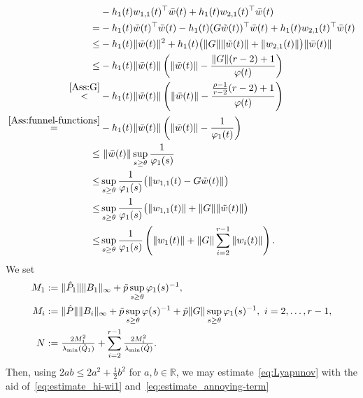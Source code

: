 \documentclass[ envcountsect, envcountsame]{svjour3}
\newcommand{\R}{\mathbb{R}}
\newcommand{\vp}{\varphi}
\begin{document}
\begin{equation} \label{eq:estimate_annoying-term}
\begin{aligned}
& -  h_1(t) w_{1,1}(t)^\top \bar w(t) +  h_1(t) w_{2,1}(t)^\top \bar w(t) \\
= & -h_1(t) \bar w(t)^\top \bar w(t) - h_1(t) (G \tilde w(t))^\top \bar w(t) +  h_1(t) w_{2,1}(t)^\top \bar w(t) \\
\le &-  h_1(t) \|\bar w(t)\|^2 +  h_1(t) \big( \|G\| \|\tilde w(t)\| + \|w_{2,1}(t)\| \big) \|\bar w(t)\| \\
\le & - h_1(t) \|\bar w(t)\| \left( \|\bar w(t)\| - \frac{\|G\|(r-2) + 1}{\vp(t)} \right) \\
\overset{\rm \ref{Ass:G}}{<} & - h_1(t) \|\bar w(t)\| \left( \|\bar w(t)\| - \frac{\frac{\rho - 1}{r-2} (r-2) + 1}{\vp(t)} \right) \\
\overset{\rm \ref{Ass:funnel-functions}}{=} & - h_1(t) \|\bar w(t)\| \left( \|\bar w(t)\| - \frac{1}{\vp_1(t)} \right) \\
\le & \  \|\bar w(t)\| \sup_{s \ge \theta} \frac{1}{\vp_1(s)} \\
\le &  \sup_{s \ge \theta} \frac{1}{\vp_1(s)}\big( \|w_{1,1}(t) - G \tilde w(t)\| \big) \\
\le &  \sup_{s \ge \theta} \frac{1}{\vp_1(s)}\big( \|w_{1,1}(t)\| + \|G\| \|\tilde w(t)\| \big) \\
\le &  \sup_{s \ge \theta} \frac{1}{\vp_1(s)}\left( \|w_{1}(t)\| + \|G\| \sum_{i=2}^{r-1}\|w_i(t)\| \right).
\end{aligned}
\end{equation}
%
We set
\begin{equation*}
\begin{aligned}
M_1 &:=  \| \hat P_1\|\|B_1\|_\infty + \tilde p \sup_{s \ge \theta} \vp_1(s)^{-1}, \\
M_i & := \|\hat P\|\|B_i\|_\infty +  \tilde p \sup_{s \ge \theta} \vp(s)^{-1} + \tilde p \|G\| \sup_{s \ge \theta} \vp_1(s)^{-1}, \ i=2,\ldots,r-1, \\
N & := \tfrac{2 M_1^2}{\lambda_{\rm min}(\hat Q_1)} + \sum_{i=2}^{r-1}\tfrac{2 M_i^2}{\lambda_{\rm min}(\hat Q)} .
\end{aligned}
\end{equation*}
Then, using $2ab \le 2a^2 + \tfrac{1}{2}b^2$ for $a,b \in \R$, 
we may estimate~\eqref{eq:Lyapunov} with the aid of~\eqref{eq:estimate_hi-wi1} and~\eqref{eq:estimate_annoying-term} 
\end{document}
